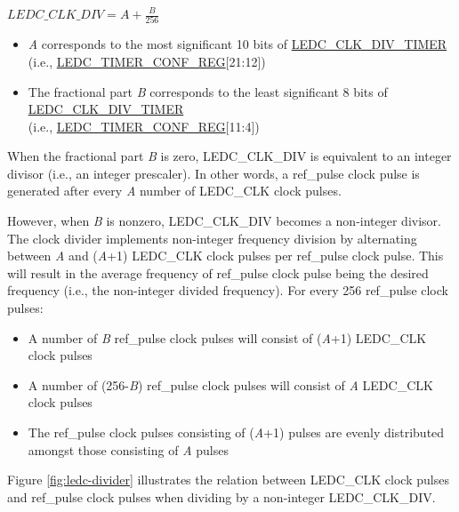 \documentclass[main\_\_EN.tex]{subfiles}
\begin{document}
\begin{center}
$LEDC\_CLK\_DIV = A + \frac{B}{256}$
\end{center}

\begin{itemize}
    \item \textit{A} corresponds to the most significant 10 bits of \hyperref[fielddesc:LEDCCLKDIVTIMERX]{LEDC\_CLK\_DIV\_TIMER} (i.e., \hyperref[regdesc:LEDCTIMERXCONFREG]{LEDC\_TIMER\_CONF\_REG}[21:12])
    \item The fractional part \textit{B} corresponds to the least significant 8 bits of \hyperref[fielddesc:LEDCCLKDIVTIMERX]{LEDC\_CLK\_DIV\_TIMER} \\(i.e., \hyperref[regdesc:LEDCTIMERXCONFREG]{LEDC\_TIMER\_CONF\_REG}[11:4])
\end{itemize}

When the fractional part \textit{B} is zero, LEDC\_CLK\_DIV is equivalent to an integer divisor (i.e., an integer prescaler). In other words, a ref\_pulse clock pulse is generated after every \textit{A} number of LEDC\_CLK clock pulses.

However, when \textit{B} is nonzero, LEDC\_CLK\_DIV becomes a non-integer divisor. The clock divider implements non-integer frequency division by alternating between \textit{A} and (\textit{A}+1) LEDC\_CLK clock pulses per ref\_pulse clock pulse. This will result in the average frequency of ref\_pulse clock pulse being the desired frequency (i.e., the non-integer divided frequency). For every 256 ref\_pulse clock pulses:

\begin{itemize}
    \item A number of \textit{B} ref\_pulse clock pulses will consist of (\textit{A}+1) LEDC\_CLK clock pulses
    \item A number of (256-\textit{B}) ref\_pulse clock pulses will consist of \textit{A} LEDC\_CLK clock pulses
    \item The ref\_pulse clock pulses consisting of (\textit{A}+1) pulses are evenly distributed amongst those consisting of \textit{A} pulses
\end{itemize}

Figure \ref{fig:ledc-divider} illustrates the relation between LEDC\_CLK clock pulses and ref\_pulse clock pulses when dividing by a non-integer LEDC\_CLK\_DIV.
\end{document}
